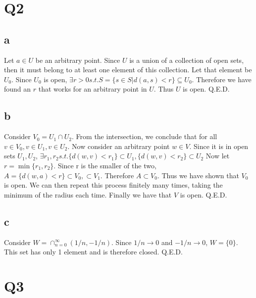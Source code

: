 \documentclass[12pt]{article}
\begin{document}
\section{Q2}
\subsection{a}
Let $a \in U$ be an arbitrary point. Since $U$ is a union of a collection of open sets, then it must belong to at least one element of this collection. Let that element be $U_0$.
\newline
Since $U_0$ is open, $\exists r>0 s.t. S=\{s \in S | d(a,s)<r\} \subseteq U_0$. Therefore we have found an $r$ that works for an arbitrary point in $U$. Thus $U$ is open. Q.E.D.

\subsection{b}
Consider $V_0 = U_1 \cap U_2$.
\newline
From the intersection, we conclude that for all $v \in V_0, v \in U_1, v \in U_2$. Now consider an arbitrary point $w \in V$. Since it is in open sets $U_1, U_2$, $\exists r_1, r_2 s.t. \{d(w,v)<r_1\} \subset U_1, \{d(w,v)<r_2\} \subset U_2$
\newline
Now let $r = \min \{r_1, r_2\}$. Since r is the smaller of the two, $A = \{d(w, a)<r \} \subset V_0, \subset V_1$. Therefore $A \subset V_0$. Thus we have shown that $V_0$ is open.
\newline
We can then repeat this process finitely many times, taking the minimum of the radius each time. Finally we have that $V$ is open. Q.E.D.

\subsection{c}
Consider $W = \cap ^\infty _{n=0} (1/n, -1/n)$. Since $1/n \to 0$ and $-1/n \to 0$, $W = \{0\}$. This set has only 1 element and is therefore closed. Q.E.D.
\newpage


\section{Q3}
\end{document}
